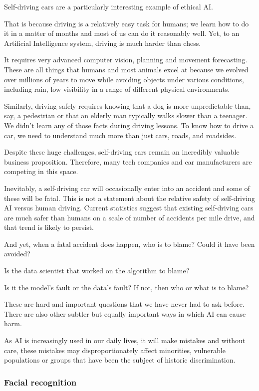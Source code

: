 \documentclass[
]{book}
\theoremstyle{definition}
\theoremstyle{definition}
\theoremstyle{definition}
\theoremstyle{definition}
\theoremstyle{remark}
\begin{document}
Self-driving cars are a particularly interesting example of ethical AI.

That is because driving is a relatively easy task for humans; we learn how to do it in a matter of months and most of us can do it reasonably well. Yet, to an Artificial Intelligence system, driving is much harder than chess.

It requires very advanced computer vision, planning and movement forecasting.
These are all things that humans and most animals excel at because we evolved
over millions of years to move while avoiding objects under various conditions,
including rain, low visibility in a range of different physical environments.

Similarly, driving safely requires knowing that a dog is more unpredictable than,
say, a pedestrian or that an elderly man typically walks slower than a teenager. We didn't learn any of those facts during driving lessons. To know how to drive
a car, we need to understand much more than just cars, roads, and roadsides.

Despite these huge challenges, self-driving cars remain an incredibly valuable business proposition. Therefore, many tech companies and car manufacturers are competing in this space.

Inevitably, a self-driving car will occasionally enter into an accident and
some of these will be fatal. This is not a statement about the relative
safety of self-driving AI versus human driving. Current statistics suggest that
existing self-driving cars are much safer than humans on a scale of number of accidents per mile drive, and that trend is likely to persist.

And yet, when a fatal accident does happen, who is to blame? Could it have been avoided?

Is the data scientist that worked on the algorithm to blame?

Is it the model's fault or the data's fault? If not, then who or what is to blame?

These are hard and important questions that we have never had to ask before. There are also other subtler but equally important ways in which AI can cause harm.

As AI is increasingly used in our daily lives, it will make mistakes and without care, these mistakes may disproportionately affect minorities, vulnerable populations or groups that have been the subject
of historic discrimination.

\hypertarget{facial-recognition}{%
\subsubsection{Facial recognition}\label{facial-recognition}}
\end{document}
